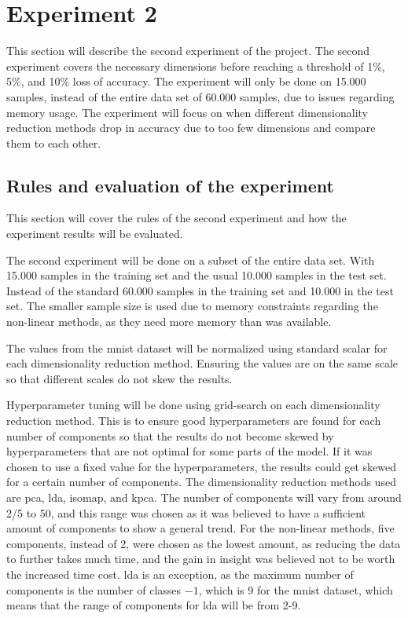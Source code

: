 \section{Experiment 2}\label{sec:experiment_2}
This section will describe the second experiment of the project. The second experiment covers the necessary dimensions before reaching a threshold of 1\%, 5\%, and 10\% loss of accuracy. The experiment will only be done on 15.000 samples, instead of the entire data set of 60.000 samples, due to issues regarding memory usage. The experiment will focus on when different dimensionality reduction methods drop in accuracy due to too few dimensions and compare them to each other.


\subsection{Rules and evaluation of the experiment}\label{subsec:experiment_2_rules}
This section will cover the rules of the second experiment and how the experiment results will be evaluated.

The second experiment will be done on a subset of the entire data set. With 15.000 samples in the training set and the usual 10.000 samples in the test set. Instead of the standard 60.000 samples in the training set and 10.000 in the test set. The smaller sample size is used due to memory constraints regarding the non-linear methods, as they need more memory than was available.

The values from the mnist dataset will be normalized using standard scalar for each dimensionality reduction method. Ensuring the values are on the same scale so that different scales do not skew the results.

Hyperparameter tuning will be done using grid-search on each dimensionality reduction method. This is to ensure good hyperparameters are found for each number of components so that the results do not become skewed by hyperparameters that are not optimal for some parts of the model. If it was chosen to use a fixed value for the hyperparameters, the results could get skewed for a certain number of components.
The dimensionality reduction methods used are \gls{pca}, \gls{lda}, \gls{isomap}, and \gls{kpca}. The number of components will vary from around 2/5 to 50, and this range was chosen as it was believed to have a sufficient amount of components to show a general trend. For the non-linear methods, five components, instead of 2, were chosen as the lowest amount, as reducing the data to further takes much time, and the gain in insight was believed not to be worth the increased time cost. \gls{lda} is an exception, as the maximum number of components is the number of classes $-1$, which is 9 for the \gls{mnist} dataset, which means that the range of components for \gls{lda} will be from 2-9.

